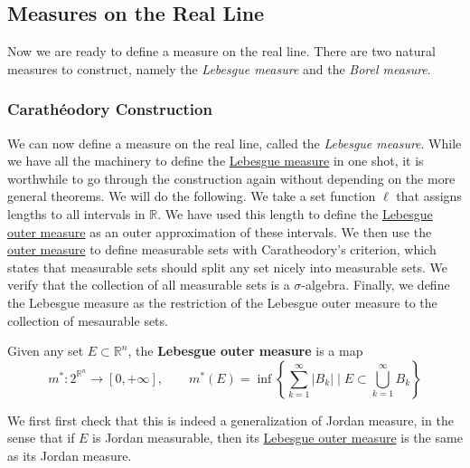 \subsection{Measures on the Real Line}

	Now we are ready to define a measure on the real line. There are two natural measures to construct, namely the \textit{Lebesgue measure} and the \textit{Borel measure}. 

\subsubsection{Carathéodory Construction}

	We can now define a measure on the real line, called the \textit{Lebesgue measure}. While we have all the machinery to define the \hyperref[def:lebesgue-measure]{Lebesgue measure} in one shot, it is worthwhile to go through the construction again without depending on the more general theorems. We will do the following. We take a set function $\ell$ that assigns lengths to all intervals in $\mathbb{R}$. We have used this length to define the \hyperref[def:lebesgue-outer-measure]{Lebesgue outer measure} as an outer approximation of these intervals. We then use the \hyperref[def:outer-measure]{outer measure} to define measurable sets with Caratheodory's criterion, which states that measurable sets should split any set nicely into measurable sets. We verify that the collection of all measurable sets is a $\sigma$-algebra. Finally, we define the Lebesgue measure as the restriction of the Lebesgue outer measure to the collection of mesaurable sets. 

  \begin{definition}
    \label{def:lebesgue-outer-measure}
    Given any set $E \subset \mathbb{R}^n$, the \textbf{Lebesgue outer measure} is a map 
    \begin{equation}
      m^\ast : 2^{\mathbb{R}^n} \to [0, +\infty], \qquad m^\ast (E) = \inf  \left\{ \sum_{k=1}^\infty |B_k| \; \bigg| \; E \subset \bigcup_{k=1}^\infty B_k \right\} 
    \end{equation}
  \end{definition} 

	We first first check that this is indeed a generalization of Jordan measure, in the sense that if $E$ is Jordan measurable, then its \hyperref[def:lebesgue-outer-measure]{Lebesgue outer measure} is the same as its Jordan measure. 

